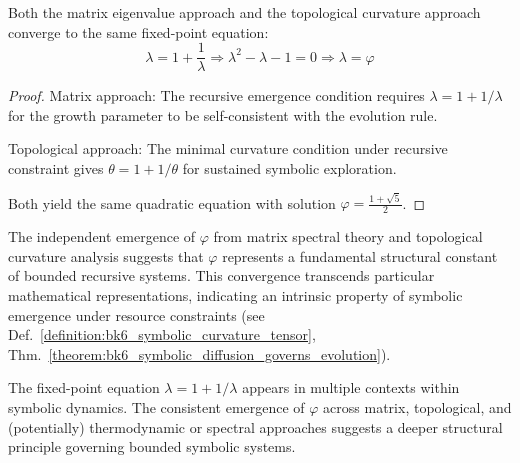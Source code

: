 \begin{theorem}
\label{theorem:appC_unified_recursive_fixed_point}
Both the matrix eigenvalue approach and the topological curvature approach converge to the same fixed-point equation:
\[
\lambda = 1 + \frac{1}{\lambda} \Rightarrow \lambda^2 - \lambda - 1 = 0 \Rightarrow \lambda = \varphi
\]
\end{theorem}

\begin{proof}
Matrix approach: The recursive emergence condition requires $\lambda = 1 + 1/\lambda$ for the growth parameter to be self-consistent with the evolution rule.

Topological approach: The minimal curvature condition under recursive constraint gives $\theta = 1 + 1/\theta$ for sustained symbolic exploration.

Both yield the same quadratic equation with solution $\varphi = \frac{1 + \sqrt{5}}{2}$.
\end{proof}

\begin{scholium}
\label{sch:appC_structural_universality_phi}
The independent emergence of $\varphi$ from matrix spectral theory and topological curvature analysis suggests that $\varphi$ represents a fundamental structural constant of bounded recursive systems. This convergence transcends particular mathematical representations, indicating an intrinsic property of symbolic emergence under resource constraints (see Def.~\ref{definition:bk6_symbolic_curvature_tensor}, Thm.~\ref{theorem:bk6_symbolic_diffusion_governs_evolution}).
\end{scholium}

\begin{remark}
\label{rem:appC_connection_other_modalities}
The fixed-point equation $\lambda = 1 + 1/\lambda$ appears in multiple contexts within symbolic dynamics. The consistent emergence of $\varphi$ across matrix, topological, and (potentially) thermodynamic or spectral approaches suggests a deeper structural principle governing bounded symbolic systems.
\end{remark}